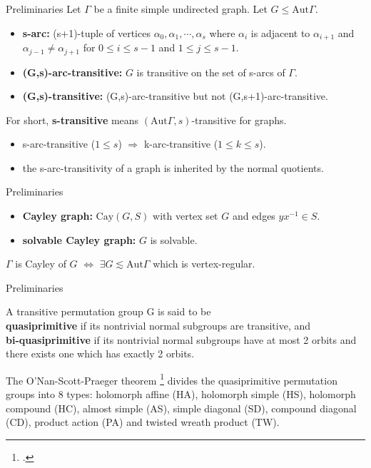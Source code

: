 \documentclass{beamer}
\def\Aut{\mathrm{Aut}}
\def\Cay{\mathrm{Cay}}
\begin{document}
\begin{frame}{Preliminaries}
Let $\Gamma$ be a finite simple undirected graph. Let $G\leq \Aut\Gamma$.
\begin{definition}
	\begin{itemize}
		\item \textbf{s-arc:} (s+1)-tuple of vertices $\alpha_0,\alpha_1,\cdots,\alpha_s$ where $\alpha_i$ is adjacent to $\alpha_{i+1}$ and $\alpha_{j-1}\neq\alpha_{j+1}$ for $0\leq i\leq s-1$ and $1\leq j\leq s-1$.
		\item \textbf{(G,s)-arc-transitive:} $G$ is transitive on the set of s-arcs of $\Gamma$.
		\item \textbf{(G,s)-transitive:} (G,s)-arc-transitive but not (G,s+1)-arc-transitive.
	\end{itemize}
For short, \textbf{s-transitive} means $(\Aut\Gamma,s)$-transitive for graphs.
\end{definition}
\begin{lemma}
	\begin{itemize}
		\item s-arc-transitive ($1\leq s$) $\Longrightarrow$ k-arc-transitive ($1\leq k\leq s$).
		\item the s-arc-transitivity of a graph is inherited by the normal quotients.
	\end{itemize} 
\end{lemma}
\end{frame}

\begin{frame}{Preliminaries}
\begin{definition}
	\begin{itemize}
		\item \textbf{Cayley graph:} $\Cay(G,S)$ with vertex set $G$ and edges $yx^{-1}\in S$.
		\item \textbf{solvable Cayley graph:} $G$ is solvable.
	\end{itemize}
\end{definition}
\begin{lemma}
	\center $\Gamma$ is Cayley of $G$ $\iff$ $\exists G\lesssim \Aut\Gamma$ which is vertex-regular.
\end{lemma}
\end{frame}

\begin{frame}{Preliminaries}
\begin{definition}
	A transitive permutation group G is said to be \\\textbf{quasiprimitive} if its nontrivial normal subgroups are transitive, and \\\textbf{bi-quasiprimitive} if its nontrivial normal subgroups have at most 2 orbits and there exists one which has exactly 2 orbits.
\end{definition}

The O'Nan-Scott-Praeger theorem \footcite{praeger_1997} divides the quasiprimitive permutation groups into 8 types: holomorph affine (HA), holomorph simple (HS), holomorph compound (HC), almost simple (AS), simple diagonal (SD), compound diagonal (CD), product action (PA) and twisted wreath product (TW).
\end{frame}
\end{document}
